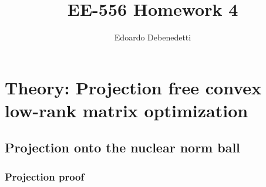 \documentclass[12pt]{article}
\title{EE-556 Homework 4}
\author{Edoardo Debenedetti}
\begin{document}
\maketitle

\section{Theory: Projection free convex low-rank matrix optimization}

\subsection{Projection onto the nuclear norm ball}
\subsubsection{Projection proof}
\end{document}
